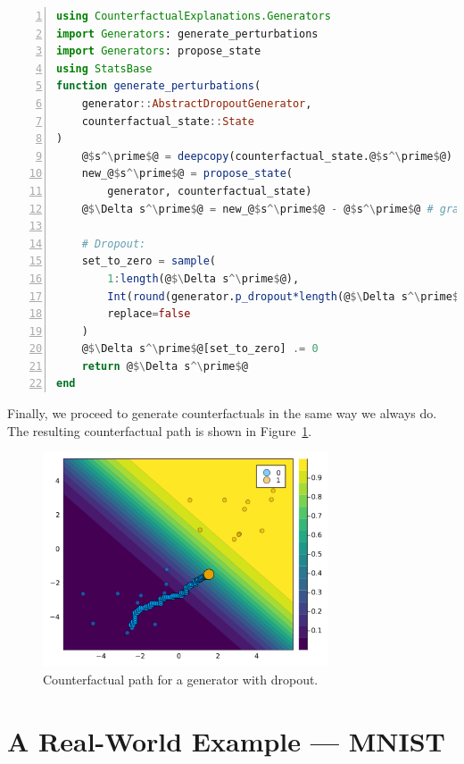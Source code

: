 \documentclass{juliacon}
\begin{document}
\begin{lstlisting}[language=Julia, escapechar=@, numbers=left, label={lst:generate}, caption={}]
using CounterfactualExplanations.Generators
import Generators: generate_perturbations
import Generators: propose_state
using StatsBase
function generate_perturbations(
    generator::AbstractDropoutGenerator, 
    counterfactual_state::State
)
    @$s^\prime$@ = deepcopy(counterfactual_state.@$s^\prime$@)
    new_@$s^\prime$@ = propose_state(
        generator, counterfactual_state)
    @$\Delta s^\prime$@ = new_@$s^\prime$@ - @$s^\prime$@ # gradient step

    # Dropout:
    set_to_zero = sample(
        1:length(@$\Delta s^\prime$@),
        Int(round(generator.p_dropout*length(@$\Delta s^\prime$@))),
        replace=false
    )
    @$\Delta s^\prime$@[set_to_zero] .= 0
    return @$\Delta s^\prime$@
end
\end{lstlisting}

Finally, we proceed to generate counterfactuals in the same way we
always do. The resulting counterfactual path is shown in
Figure~\ref{fig-dropout}.

\begin{figure}

{\centering \includegraphics[width=3.33333in,height=2.5in]{www/dropout.png}

}

\caption{\label{fig-dropout}Counterfactual path for a generator with
dropout.}

\end{figure}

\hypertarget{sec-emp}{%
\section{A Real-World Example --- MNIST}\label{sec-emp}}
\end{document}
